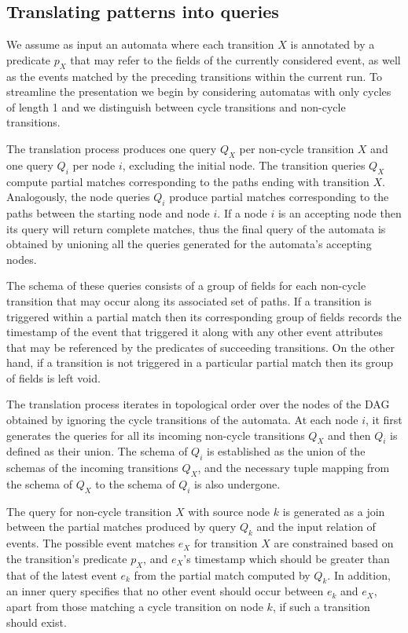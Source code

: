 \subsection{Translating patterns into queries}

We assume as input an automata where each transition $X$ is annotated by a
predicate $p_X$ that may refer to the fields of the currently considered event,
as well as the events matched by the preceding transitions within the current
run.
To streamline the presentation we begin by considering automatas with only
cycles of length 1 and we distinguish between cycle transitions and
non-cycle transitions.


The translation process produces one query $Q_X$ per non-cycle transition $X$
and one query $Q_i$ per node $i$, excluding the initial node.
The transition queries $Q_X$ compute partial matches corresponding to the paths
ending with transition $X$.
Analogously, the node queries $Q_i$ produce partial matches corresponding to the
paths between the starting node and node $i$.
If a node $i$ is an accepting node then its query will return complete matches,
thus the final query of the automata is obtained by unioning all the queries
generated for the automata's accepting nodes.


The schema of these queries consists of a group of fields for each non-cycle
transition that may occur along its associated set of paths. If a transition is
triggered within a partial match then its corresponding group of fields records
the timestamp of the event that triggered it along with any other event
attributes that may be referenced by the predicates of succeeding transitions.
On the other hand, if a transition is not triggered in a particular partial
match then its group of fields is left void.


The translation process iterates in topological order over the nodes of the DAG
obtained by ignoring the cycle transitions of the automata.
At each node $i$, it first generates the queries for all its incoming
non-cycle transitions $Q_X$ and then $Q_i$ is defined as their union. 
The schema of $Q_i$ is established as the
union of the schemas of the incoming transitions $Q_X$, and the necessary tuple
mapping from the schema of $Q_X$ to the schema of $Q_i$ is also undergone.

The query for non-cycle transition $X$ with source node $k$ is generated as a
join between the partial matches produced by query $Q_k$ and the input
relation of events.
The possible event matches $e_X$ for transition $X$ are constrained based on the
transition's predicate $p_X$, and $e_X$'s timestamp which should be greater than
that of the latest event $e_k$ from the partial match computed by $Q_k$.
In addition, an inner query specifies that no other event should occur between
$e_k$ and $e_X$, apart from those matching a cycle transition on node $k$, if
such a transition should exist.



